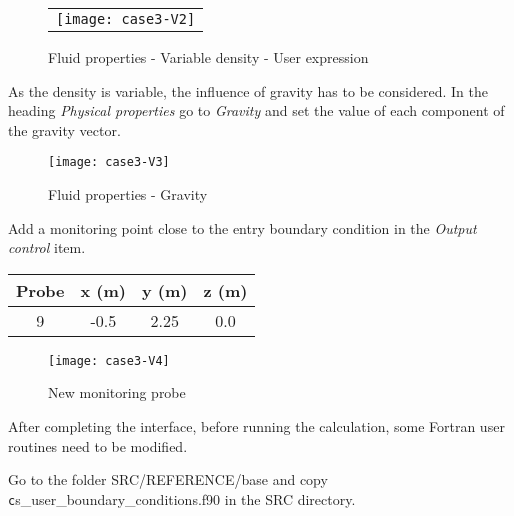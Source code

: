 \newpage
\begin{figure}[h!]
\begin{center}
\begin{tabular}{c}
\texttt{[image: case3-V2]}
\end{tabular}
\caption{Fluid properties - Variable density - User expression}
\label{fig1_e3}
\end{center}
\end{figure}

\newpage
As the density is variable, the influence of gravity has to be considered. In the
heading {\itshape Physical properties} go to
{\itshape Gravity} and set the value of each component of the gravity vector.


\begin{figure}[h!]
\begin{center}
\texttt{[image: case3-V3]}
\caption{Fluid properties - Gravity}
\label{fig2_e3}
\end{center}
\end{figure}


\newpage
Add a monitoring point close to the entry boundary condition in the
{\itshape Output control} item.

\begin{center}
\begin{tabular}{|c|c|c|c|}
\hline
Probe & x (m) & y (m) & z (m)\\
\hline
\hline
9 & -0.5 & 2.25 & 0.0 \\
\hline
\end{tabular}
\end{center}

\begin{figure}[h!]
\begin{center}
\texttt{[image: case3-V4]}
\caption{New monitoring probe}
\label{fig3_e3}
\end{center}
\end{figure}


\newpage
After completing the interface, before running the calculation,
some Fortran user routines need to be modified.

Go to the folder SRC/REFERENCE/base and copy {\texttt cs\_user\_boundary\_conditions.f90} in the SRC directory.

